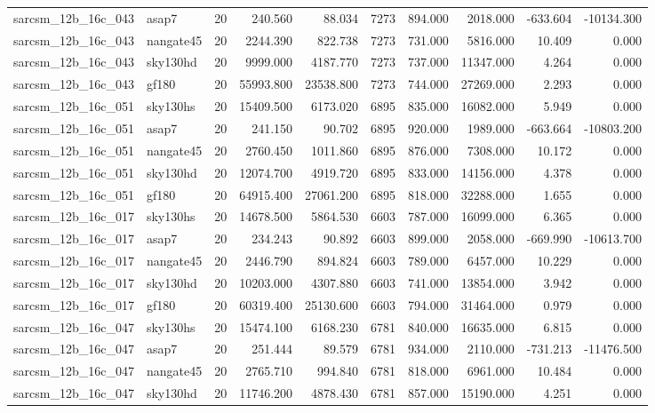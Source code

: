 \documentclass{article}
\begin{document}
\begin{longtable}{llrrrrrrrr}
sarcsm\_12b\_16c\_043 & asap7 & 20 & 240.560 & 88.034 & 7273 & 894.000 & 2018.000 & -633.604 & -10134.300 \\
sarcsm\_12b\_16c\_043 & nangate45 & 20 & 2244.390 & 822.738 & 7273 & 731.000 & 5816.000 & 10.409 & 0.000 \\
sarcsm\_12b\_16c\_043 & sky130hd & 20 & 9999.000 & 4187.770 & 7273 & 737.000 & 11347.000 & 4.264 & 0.000 \\
sarcsm\_12b\_16c\_043 & gf180 & 20 & 55993.800 & 23538.800 & 7273 & 744.000 & 27269.000 & 2.293 & 0.000 \\
sarcsm\_12b\_16c\_051 & sky130hs & 20 & 15409.500 & 6173.020 & 6895 & 835.000 & 16082.000 & 5.949 & 0.000 \\
sarcsm\_12b\_16c\_051 & asap7 & 20 & 241.150 & 90.702 & 6895 & 920.000 & 1989.000 & -663.664 & -10803.200 \\
sarcsm\_12b\_16c\_051 & nangate45 & 20 & 2760.450 & 1011.860 & 6895 & 876.000 & 7308.000 & 10.172 & 0.000 \\
sarcsm\_12b\_16c\_051 & sky130hd & 20 & 12074.700 & 4919.720 & 6895 & 833.000 & 14156.000 & 4.378 & 0.000 \\
sarcsm\_12b\_16c\_051 & gf180 & 20 & 64915.400 & 27061.200 & 6895 & 818.000 & 32288.000 & 1.655 & 0.000 \\
sarcsm\_12b\_16c\_017 & sky130hs & 20 & 14678.500 & 5864.530 & 6603 & 787.000 & 16099.000 & 6.365 & 0.000 \\
sarcsm\_12b\_16c\_017 & asap7 & 20 & 234.243 & 90.892 & 6603 & 899.000 & 2058.000 & -669.990 & -10613.700 \\
sarcsm\_12b\_16c\_017 & nangate45 & 20 & 2446.790 & 894.824 & 6603 & 789.000 & 6457.000 & 10.229 & 0.000 \\
sarcsm\_12b\_16c\_017 & sky130hd & 20 & 10203.000 & 4307.880 & 6603 & 741.000 & 13854.000 & 3.942 & 0.000 \\
sarcsm\_12b\_16c\_017 & gf180 & 20 & 60319.400 & 25130.600 & 6603 & 794.000 & 31464.000 & 0.979 & 0.000 \\
sarcsm\_12b\_16c\_047 & sky130hs & 20 & 15474.100 & 6168.230 & 6781 & 840.000 & 16635.000 & 6.815 & 0.000 \\
sarcsm\_12b\_16c\_047 & asap7 & 20 & 251.444 & 89.579 & 6781 & 934.000 & 2110.000 & -731.213 & -11476.500 \\
sarcsm\_12b\_16c\_047 & nangate45 & 20 & 2765.710 & 994.840 & 6781 & 818.000 & 6961.000 & 10.484 & 0.000 \\
sarcsm\_12b\_16c\_047 & sky130hd & 20 & 11746.200 & 4878.430 & 6781 & 857.000 & 15190.000 & 4.251 & 0.000 \\

\end{longtable}
\end{document}
